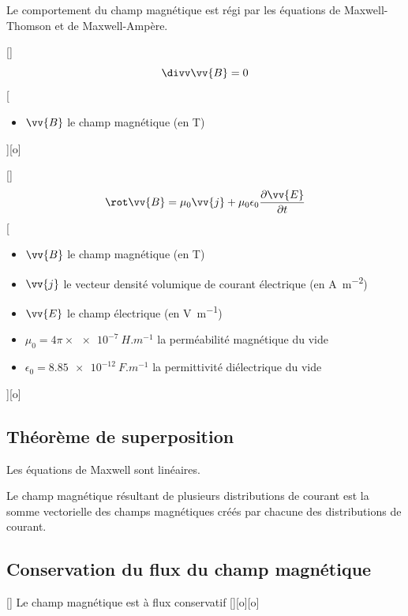 Le comportement du champ magnétique est régi par les équations de Maxwell-Thomson et de Maxwell-Ampère.

[]
{$$\divv\vv{B}=0$$}
[
    \begin{itemize}
        \item $\vv{B}$ le champ magnétique (en \unit{T})
    \end{itemize}
][o]


[]
{$$\rot\vv{B}=\mu_0\vv{j}+\mu_0\epsilon_0\frac{\partial\vv{E}}{\partial t}$$}
[
    \begin{itemize}
        \item $\vv{B}$ le champ magnétique (en \unit{T})
        \item $\vv{j}$ le vecteur densité volumique de courant électrique (en \unit{A.m^{-2}})
        \item $\vv{E}$ le champ électrique (en \unit{V.m^{-1}})
        \item $\mu_0=4\pi \times \SI{e-7}{H.m^{-1}}$ la perméabilité magnétique du vide
        \item $\epsilon_0=\SI{8.85e-12}{F.m^{-1}}$ la permittivité diélectrique du vide
    \end{itemize}
][o]


\subsection{Théorème de superposition}
Les équations de Maxwell sont linéaires.

Le champ magnétique résultant de plusieurs distributions de courant est la somme vectorielle des champs magnétiques créés par chacune des distributions de courant.

\subsection{Conservation du flux du champ magnétique}

[]
{Le champ magnétique est à flux conservatif}
[][o][o]


